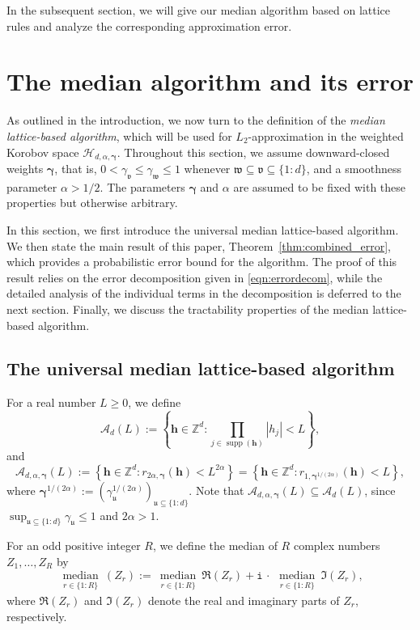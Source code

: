 \documentclass[a4paper,11pt]{article}
\newcommand{\bsh}{\boldsymbol{h}}
\newcommand{\bsgamma}{\boldsymbol{\gamma}}
\newcommand{\ZZ}{\mathbb{Z}}
\newcommand{\Acal}{\mathcal{A}}
\newcommand{\Hcal}{\mathcal{H}}
\newcommand{\fraku}{\mathfrak{u}}
\DeclareMathOperator{\supp}{supp}
\newcommand{\icomp}{\mathtt{i}}
\newcommand{\abs}[1]{\left\vert#1\right\vert}
\begin{document}
In the subsequent section, we will give our median algorithm based on lattice rules and analyze the corresponding approximation error. 




\section{The median algorithm and its error}\label{sec:median}

As outlined in the introduction, we now turn to the definition of the \emph{median lattice-based algorithm}, which will be used for $L_2$-approximation in the weighted Korobov space $\Hcal_{d,\alpha,\bsgamma}$. Throughout this section, we assume downward-closed weights $\bsgamma$, that is, $0<\gamma_{\mathfrak{v}} \le \gamma_{\mathfrak{w}}\le 1$ whenever $\mathfrak{w}\subseteq \mathfrak{v}\subseteq \{1{:}d\}$, and a smoothness parameter $\alpha>1/2$. The parameters $\bsgamma$ and $\alpha$ are assumed to be fixed with these properties but otherwise arbitrary.

In this section, we first introduce the universal median lattice-based algorithm. We then state the main result of this paper, Theorem~\ref{thm:combined_error}, which provides a probabilistic error bound for the algorithm. The proof of this result relies on the error decomposition given in \eqref{eqn:errordecom}, while the detailed analysis of the individual terms in the decomposition is deferred to the next section. Finally, we discuss the tractability properties of the median lattice-based algorithm.


\subsection{The universal median lattice-based algorithm}
For a real number $L \geq 0$, we define
\[
\Acal_{d}(L) := \left\{ \bsh \in \ZZ^d : \prod_{j\in \supp(\bsh)} \abs{h_j} < L \right\},
\]
and
\[
\Acal_{d,\alpha,\bsgamma}(L) := \left\{ \bsh \in \ZZ^d : r_{2\alpha, \bsgamma}(\bsh) < L^{2\alpha} \right\}=\left\{ \bsh \in \ZZ^d : r_{1, \bsgamma^{1/(2\alpha)}}(\bsh) < L\right\},
\]
where $\bsgamma^{1/(2\alpha)} := (\gamma_{\fraku}^{1/(2\alpha)})_{\fraku \subseteq \{1{:}d\}}$.
Note that $\Acal_{d,\alpha,\bsgamma}(L) \subseteq \Acal_{d}(L)$, since $\sup_{\fraku \subseteq \{1{:}d\}} \gamma_{\fraku} \leq 1$ and $2\alpha > 1$.

For an odd positive integer $R$, we define the median of $R$ complex numbers $Z_1,\dots,Z_R$ by
\[
  \operatorname*{median}_{\substack{r\in\{1{:}R\}}} (Z_r)
  := \operatorname*{median}_{\substack{r\in\{1{:}R\}}} \Re(Z_r)
     + \icomp \,\cdot\, \operatorname*{median}_{\substack{r\in\{1{:}R\}}} \Im(Z_r),
\]
where $\Re(Z_r)$ and $\Im(Z_r)$ denote the real and imaginary parts of $Z_r$, respectively.  
\end{document}
